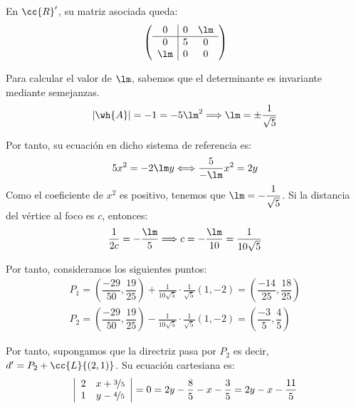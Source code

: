 \begin{ejercicio}
\begin{enumerate}
        En $\cc{R}'$, su matriz asociada queda:
        \begin{equation*}
            \left(\begin{array}{c|cc}
                0 & 0 & \lm  \\ \hline
                0 & 5 & 0 \\
                \lm & 0 & 0
            \end{array}\right)
        \end{equation*}

        Para calcular el valor de $\lm$, sabemos que el determinante es invariante mediante semejanzas.
        \begin{equation*}
            |\wh{A}|=-1= -5\lm^2 \Longrightarrow \lm = \pm \frac{1}{\sqrt{5}}
        \end{equation*}

        Por tanto, su ecuación en dicho sistema de referencia es:
        \begin{equation*}
            5x^2=-2\lm y \Longleftrightarrow \frac{5}{-\lm}x^2 = 2y
        \end{equation*}
        Como el coeficiente de $x^2$ es positivo, tenemos que $\lm =-\dfrac{1}{\sqrt{5}}$. Si la distancia del vértice al foco es $c$, entonces:
        \begin{equation*}
            \frac{1}{2c} = -\frac{\lm}{5} \Longrightarrow c = -\frac{\lm}{10} = \frac{1}{10\sqrt{5}}
        \end{equation*}

        Por tanto, consideramos los siguientes puntos:
        \begin{gather*}
            P_1 = \left(\dfrac{-29}{50},\dfrac{19}{25}\right) + \frac{1}{10\sqrt{5}}\cdot \frac{1}{\sqrt{5}}(1,-2)
            = \left(\dfrac{-14}{25},\dfrac{18}{25}\right) \\
            P_2 = \left(\dfrac{-29}{50},\dfrac{19}{25}\right) - \frac{1}{10\sqrt{5}}\cdot \frac{1}{\sqrt{5}}(1,-2)
            = \left(\dfrac{-3}{5},\dfrac{4}{5}\right)
        \end{gather*}

        Por tanto, supongamos que la directriz pasa por $P_2$ es decir, $d'=P_2+\cc{L}\{(2,1)\}$. Su ecuación cartesiana es:
        \begin{equation*}
            \left|\begin{array}{cc}
                2 & x+\nicefrac{3}{5} \\
                1 & y-\nicefrac{4}{5}
            \end{array}\right| = 0 = 2y-\frac{8}{5}-x-\frac{3}{5} = 2y-x-\frac{11}{5}
        \end{equation*}
    

\end{enumerate}
\end{ejercicio}
